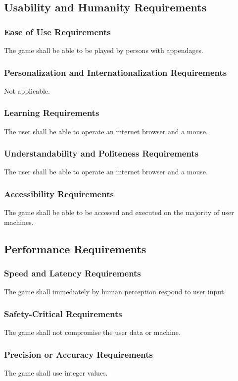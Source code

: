 \documentclass[11pt, oneside]{article}   	%
\begin{document}
\subsection{Usability and Humanity Requirements}
\subsubsection{Ease of Use Requirements}
The game shall be able to be played by persons with appendages.


\subsubsection{Personalization and Internationalization Requirements}
Not applicable.


\subsubsection{Learning Requirements}
The user shall be able to operate an internet browser and a mouse.


\subsubsection{Understandability and Politeness Requirements}
The user shall be able to operate an internet browser and a mouse.


\subsubsection{Accessibility Requirements}
The game shall be able to be accessed and executed on the majority of user machines.


\subsection{Performance Requirements}
\subsubsection{Speed and Latency Requirements}
The game shall immediately by human perception respond to user input.


\subsubsection{Safety-Critical Requirements}
The game shall not compromise the user data or machine.


\subsubsection{Precision or Accuracy Requirements}
The game shall use integer values.
\end{document}
